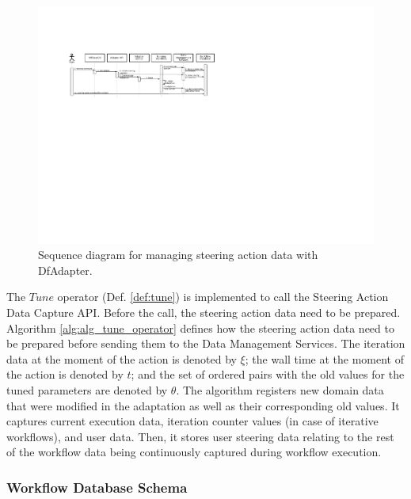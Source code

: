 \begin{figure}[H]
    \centering
    \includegraphics[width=\textwidth,keepaspectratio]{img/seq-diagram-dfadapter.pdf}
    \caption{Sequence diagram for managing steering action data with DfAdapter.}
    \label{fig:dfadapter_seq_diagram}
\end{figure}

The $Tune$ operator (Def. \ref{def:tune}) is implemented
to call the Steering Action Data Capture API. Before the call,
the steering action data need to be prepared.
Algorithm \ref{alg:alg_tune_operator} defines how the steering action data need to
be prepared before sending them to the Data Management Services.
The iteration data at the moment of the action is denoted by  $\xi$; the wall time at the moment of the
action is denoted by $t$; and the set of ordered pairs with
the old values for the tuned parameters are denoted by $\theta$.
The algorithm registers new domain data that
were modified in the adaptation as well as
 their corresponding old values. It captures current execution
data, iteration counter values (in case of iterative workflows), and
user data. Then, it stores user steering data relating to the rest of the workflow data
being continuously captured during workflow execution.




\subsubsection{Workflow Database Schema}
\label{sec:dfadapter_wfschema}

